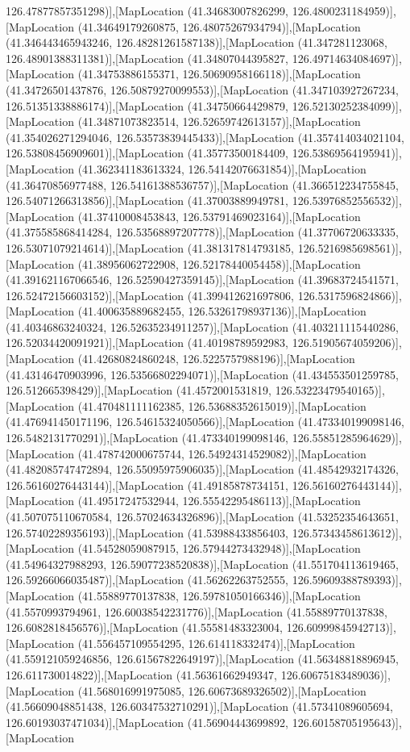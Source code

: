 126.47877857351298)],[MapLocation (41.34683007826299, 126.4800231184959)],[MapLocation (41.34649179260875, 126.48075267934794)],[MapLocation (41.346443465943246, 126.48281261587138)],[MapLocation (41.347281123068, 126.48901388311381)],[MapLocation (41.34807044395827, 126.49714634084697)],[MapLocation (41.34753886155371, 126.50690958166118)],[MapLocation (41.34726501437876, 126.50879270099553)],[MapLocation (41.347103927267234, 126.51351338886174)],[MapLocation (41.34750664429879, 126.52130252384099)],[MapLocation (41.34871073823514, 126.52659742613157)],[MapLocation (41.354026271294046, 126.53573839445433)],[MapLocation (41.357414034021104, 126.53808456909601)],[MapLocation (41.35773500184409, 126.53869564195941)],[MapLocation (41.362341183613324, 126.54142076631854)],[MapLocation (41.36470856977488, 126.54161388536757)],[MapLocation (41.366512234755845, 126.54071266313856)],[MapLocation (41.37003889949781, 126.53976852556532)],[MapLocation (41.37410008453843, 126.53791469023164)],[MapLocation (41.375585868414284, 126.53568897207778)],[MapLocation (41.37706720633335, 126.53071079214614)],[MapLocation (41.381317814793185, 126.5216985698561)],[MapLocation (41.38956062722908, 126.52178440054458)],[MapLocation (41.391621167066546, 126.52590427359145)],[MapLocation (41.39683724541571, 126.52472156603152)],[MapLocation (41.399412621697806, 126.5317596824866)],[MapLocation (41.400635889682455, 126.53261798937136)],[MapLocation (41.40346863240324, 126.52635234911257)],[MapLocation (41.403211115440286, 126.52034420091921)],[MapLocation (41.40198789592983, 126.51905674059206)],[MapLocation (41.42680824860248, 126.5225757988196)],[MapLocation (41.43146470903996, 126.53566802294071)],[MapLocation (41.434553501259785, 126.512665398429)],[MapLocation (41.4572001531819, 126.53223479540165)],[MapLocation (41.470481111162385, 126.53688352615019)],[MapLocation (41.476941450171196, 126.54615324050566)],[MapLocation (41.473340199098146, 126.5482131770291)],[MapLocation (41.473340199098146, 126.55851285964629)],[MapLocation (41.478742000675744, 126.54924314529082)],[MapLocation (41.482085747472894, 126.55095975906035)],[MapLocation (41.48542932174326, 126.56160276443144)],[MapLocation (41.49185878734151, 126.56160276443144)],[MapLocation (41.49517247532944, 126.55542295486113)],[MapLocation (41.507075110670584, 126.57024634326896)],[MapLocation (41.53252354643651, 126.57402289356193)],[MapLocation (41.53988433856403, 126.57343458613612)],[MapLocation (41.54528059087915, 126.57944273432948)],[MapLocation (41.54964327988293, 126.59077238520838)],[MapLocation (41.551704113619465, 126.59266066035487)],[MapLocation (41.56262263752555, 126.59609388789393)],[MapLocation (41.55889770137838, 126.59781050166346)],[MapLocation (41.5570993794961, 126.60038542231776)],[MapLocation (41.55889770137838, 126.6082818456576)],[MapLocation (41.55581483323004, 126.60999845942713)],[MapLocation (41.556457109554295, 126.614118332474)],[MapLocation (41.559121059246856, 126.61567822649197)],[MapLocation (41.56348818896945, 126.611730014822)],[MapLocation (41.56361662949347, 126.60675183489036)],[MapLocation (41.568016991975085, 126.60673689326502)],[MapLocation (41.56609048851438, 126.60347532710291)],[MapLocation (41.57341089605694, 126.60193037471034)],[MapLocation (41.56904443699892, 126.60158705195643)],[MapLocation 